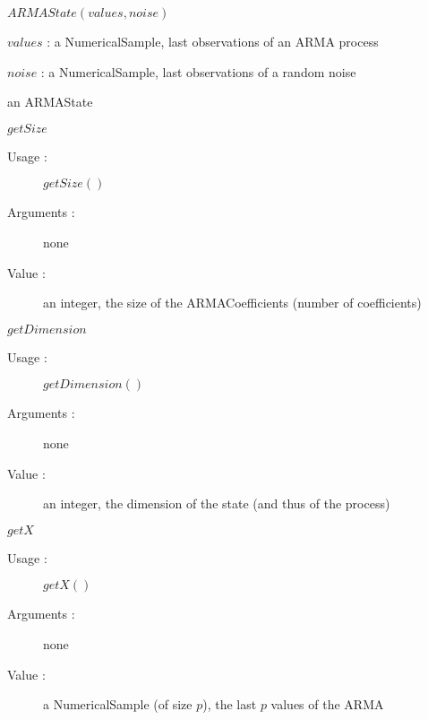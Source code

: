 \begin{description}

\item[Usage :] \rule{0pt}{1em}
  \begin{description}  
  \item $ARMAState(values, noise)$
  \end{description}
  \bigskip

\item[Arguments :]  \rule{0pt}{1em}
  \begin{description}
  \item $values$ : a NumericalSample, last observations of an ARMA process
  \item $noise$  : a NumericalSample, last observations of a random noise
  \end{description}
  \bigskip

\item[Value :] an ARMAState
  \bigskip

\item[Some methods :]  \rule{0pt}{1em}

  \begin{description}

   \item $getSize$
    \begin{description}
    \item[Usage :] $getSize()$
    \item[Arguments :] none
    \item[Value :]   an integer, the size of the ARMACoefficients (number of coefficients)
    \end{description}
    \bigskip

   \item $getDimension$
    \begin{description}
    \item[Usage :] $getDimension()$
    \item[Arguments :] none
    \item[Value :]   an integer, the dimension of the state (and thus of the process)
    \end{description}
    \bigskip

   \item $getX$
    \begin{description}
    \item[Usage :] $getX()$
    \item[Arguments :] none
    \item[Value :] a NumericalSample (of size $p$), the last $p$ values of the ARMA
    \end{description}
    \bigskip


\end{description}
\end{description}
